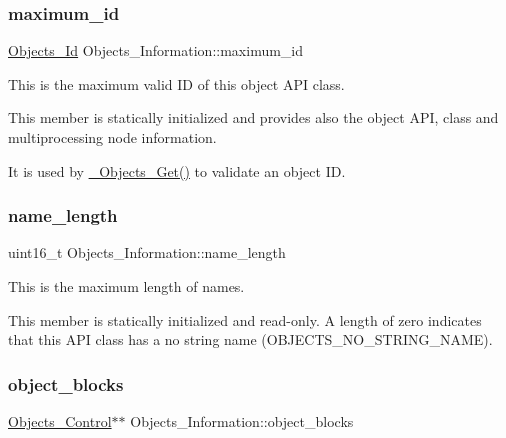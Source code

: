 \subsubsection{\texorpdfstring{maximum\_id}{maximum\_id}}
{\footnotesize\ttfamily \mbox{\hyperlink{group__RTEMSScoreObject_ga5821f52a51072941bdd603e542d0863e}{Objects\+\_\+\+Id}} Objects\+\_\+\+Information\+::maximum\+\_\+id}



This is the maximum valid ID of this object A\+PI class. 

This member is statically initialized and provides also the object A\+PI, class and multiprocessing node information.

It is used by \mbox{\hyperlink{group__RTEMSScoreObject_gaccc5682133e4f65b8cb374eab9be2c9d}{\+\_\+\+Objects\+\_\+\+Get()}} to validate an object ID. \mbox{\label{structObjects__Information_a98fd0f4571cc24ceb57c70869bbc7154}} 
\subsubsection{\texorpdfstring{name\_length}{name\_length}}
{\footnotesize\ttfamily uint16\+\_\+t Objects\+\_\+\+Information\+::name\+\_\+length}



This is the maximum length of names. 

This member is statically initialized and read-\/only. A length of zero indicates that this A\+PI class has a no string name (O\+B\+J\+E\+C\+T\+S\+\_\+\+N\+O\+\_\+\+S\+T\+R\+I\+N\+G\+\_\+\+N\+A\+ME). \mbox{\label{structObjects__Information_abf727c0782225fa94a341268cfcbf412}} 
\subsubsection{\texorpdfstring{object\_blocks}{object\_blocks}}
{\footnotesize\ttfamily \mbox{\hyperlink{structObjects__Control}{Objects\+\_\+\+Control}}$\ast$$\ast$ Objects\+\_\+\+Information\+::object\+\_\+blocks}



